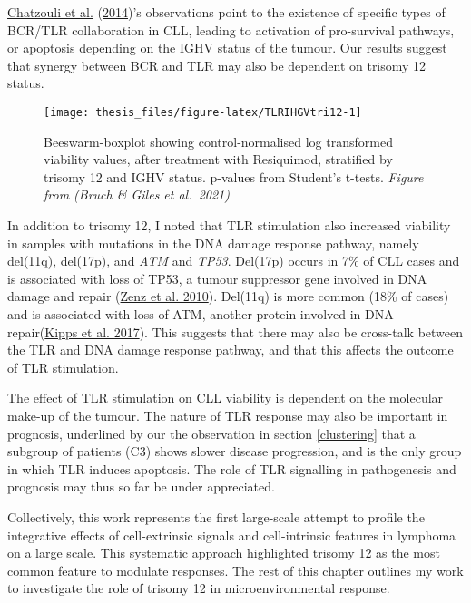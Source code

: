 \documentclass[11pt, a4paper, twosided]{book}
\begin{document}
\protect\hyperlink{ref-Chatzouli2014}{Chatzouli et al.} (\protect\hyperlink{ref-Chatzouli2014}{2014})'s observations point to the existence of specific types of BCR/TLR collaboration in CLL, leading to activation of pro-survival pathways, or apoptosis depending on the IGHV status of the tumour. Our results suggest that synergy between BCR and TLR may also be dependent on trisomy 12 status.


\begin{figure}

{\centering \texttt{[image: thesis\_files/figure-latex/TLRIHGVtri12-1]} 

}

\caption{Beeswarm-boxplot showing control-normalised log transformed viability values, after treatment with Resiquimod, stratified by trisomy 12 and IGHV status. p-values from Student's t-tests. \emph{Figure from (Bruch \& Giles et al.~2021)}}\label{fig:TLRIHGVtri12}
\end{figure}
In addition to trisomy 12, I noted that TLR stimulation also increased viability in samples with mutations in the DNA damage response pathway, namely del(11q), del(17p), and \emph{ATM} and \emph{TP53}. Del(17p) occurs in 7\% of CLL cases and is associated with loss of TP53, a tumour suppressor gene involved in DNA damage and repair (\protect\hyperlink{ref-Zenz2010}{Zenz et al. 2010}). Del(11q) is more common (18\% of cases) and is associated with loss of ATM, another protein involved in DNA repair(\protect\hyperlink{ref-Kipps2017}{Kipps et al. 2017}). This suggests that there may also be cross-talk between the TLR and DNA damage response pathway, and that this affects the outcome of TLR stimulation.

The effect of TLR stimulation on CLL viability is dependent on the molecular make-up of the tumour. The nature of TLR response may also be important in prognosis, underlined by our the observation in section \ref{clustering} that a subgroup of patients (C3) shows slower disease progression, and is the only group in which TLR induces apoptosis. The role of TLR signalling in pathogenesis and prognosis may thus so far be under appreciated.

Collectively, this work represents the first large-scale attempt to profile the integrative effects of cell-extrinsic signals and cell-intrinsic features in lymphoma on a large scale. This systematic approach highlighted trisomy 12 as the most common feature to modulate responses. The rest of this chapter outlines my work to investigate the role of trisomy 12 in microenvironmental response.
\end{document}

